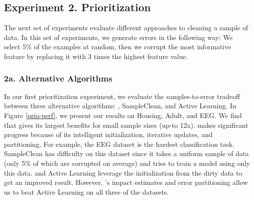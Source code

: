 \subsection{Experiment 2. Prioritization}
The next set of experiments evaluate different approaches to cleaning a sample of data.
In this set of experiments, we generate errors in the following way: We select 5\% of the examples at random, then we corrupt the most informative feature by replacing it with 3 times the highest feature value.

\subsubsection{2a. Alternative Algorithms}
In our first prioritization experiment, we evaluate the samples-to-error tradeoff between three alternative algorithms: \sys, SampleClean, and Active Learning.
In Figure \ref{prio-perf}, we present our results on Housing, Adult, and EEG. 
We find that \sys gives its largest benefits for small sample sizes (up-to 12x).
\sys makes significant progress because of its intelligent initialization, iterative updates, and partitioning.
For example, the EEG dataset is the hardest classification task.
SampleClean has difficulty on this dataset since it takes a uniform sample of data (only 5\% of which are corrupted on average) and tries to train a model using only this data.
\sys and Active Learning leverage the initialization from the dirty data to get an improved result. 
However, \sys's impact estimates and error partitioning allow us to beat Active Learning on all three of the datasets.

